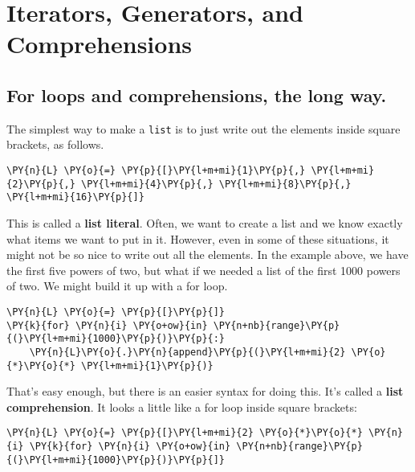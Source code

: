\chapter{Iterators, Generators, and Comprehensions}

\section{For loops and comprehensions, the long way.}


The simplest way to make a \texttt{list} is to just write out the elements inside square brackets, as follows.

\begin{Verbatim}[commandchars=\\\{\}]
\PY{n}{L} \PY{o}{=} \PY{p}{[}\PY{l+m+mi}{1}\PY{p}{,} \PY{l+m+mi}{2}\PY{p}{,} \PY{l+m+mi}{4}\PY{p}{,} \PY{l+m+mi}{8}\PY{p}{,} \PY{l+m+mi}{16}\PY{p}{]}
\end{Verbatim}



This is called a \textbf{list literal}.  Often, we want to create a list and we know exactly what items we want to put in it.
However, even in some of these situations, it might not be so nice to write out all the elements.  In the example above, we have the first five powers of two, but what if we needed a list of the first 1000 powers of two.  We might build it up with a for loop.

\begin{Verbatim}[commandchars=\\\{\}]
\PY{n}{L} \PY{o}{=} \PY{p}{[}\PY{p}{]}
\PY{k}{for} \PY{n}{i} \PY{o+ow}{in} \PY{n+nb}{range}\PY{p}{(}\PY{l+m+mi}{1000}\PY{p}{)}\PY{p}{:}
    \PY{n}{L}\PY{o}{.}\PY{n}{append}\PY{p}{(}\PY{l+m+mi}{2} \PY{o}{*}\PY{o}{*} \PY{l+m+mi}{1}\PY{p}{)}
\end{Verbatim}



That’s easy enough, but there is an easier syntax for doing this.  It’s called a \textbf{list comprehension}.  It looks a little like a for loop inside square brackets:

\begin{Verbatim}[commandchars=\\\{\}]
\PY{n}{L} \PY{o}{=} \PY{p}{[}\PY{l+m+mi}{2} \PY{o}{*}\PY{o}{*} \PY{n}{i} \PY{k}{for} \PY{n}{i} \PY{o+ow}{in} \PY{n+nb}{range}\PY{p}{(}\PY{l+m+mi}{1000}\PY{p}{)}\PY{p}{]}
\end{Verbatim}



